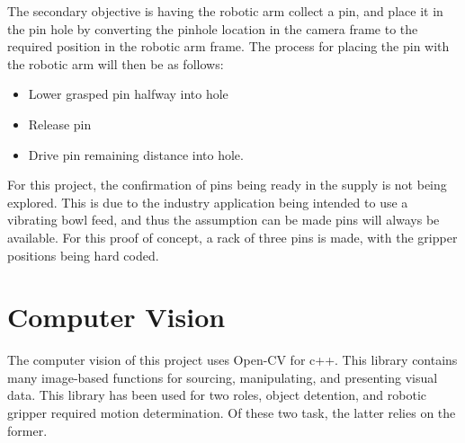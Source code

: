 \documentclass[11pt,a4paper, margin=1in]{report}
\begin{document}
The secondary objective is having the robotic arm collect a pin, and place it in the pin hole by converting the pinhole location in the camera frame to the required position in the robotic arm frame. The process for placing the pin with the robotic arm will then be as follows:
\begin{itemize}  \setlength\itemsep{1pt}
\item Lower grasped pin halfway into hole
\item Release pin
\item Drive pin remaining distance into hole.
\end{itemize}

For this project, the confirmation of pins being ready in the supply is not being explored. This is due to the industry application being intended to use a vibrating bowl feed, and thus the assumption can be made pins will always be available. For this proof of concept, a rack of three pins is made, with the gripper positions being hard coded.\\    


\chapter{Computer Vision}
The computer vision of this project uses Open-CV for c++. This library contains many image-based functions for sourcing, manipulating, and presenting visual data. This library has been used for two roles, object detention, and robotic gripper required motion determination. Of these two task, the latter relies on the former. 
\end{document}
